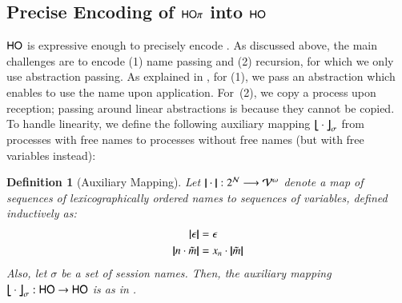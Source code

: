 \documentclass[preprint,11pt]{elsarticle}
\newtheorem{definition}{Definition}[section]
\begin{document}
{\subsection{Precise Encoding of $\mathsf{HO}\pi$ into $\mathsf{HO}$}
\label{subsec:HOpi_to_HO}
$\mathsf{HO}$ is expressive enough to
precisely encode \HOp.
As discussed above, the main challenges are to encode (1) name passing 
and (2) recursion, 
for which 
we only use  abstraction passing. 
 As explained in , for (1), we pass  
an %
abstraction which enables to use the name upon application. 
For~(2), we 
copy a process upon reception; passing around linear abstractions
is  
because 
they cannot be copied.
To handle linearity, we define the following auxiliary 
 mapping 
$\big\lfloor\!\!\big\lfloor\cdot\big\rfloor\!\!\big\rfloor^{}_\sigma$
from processes with free names to processes without free
names (but with free variables instead):


%

%




\begin{definition}[Auxiliary Mapping] \label{d:trabs}\label{d:auxmap}
	Let $|\!|\cdot|\!|: 2^{\mathcal{N}} \longrightarrow \mathcal{V}^\omega$
	denote a map of sequences of lexicographically ordered names to sequences of variables, defined
	inductively 
	as: 
	\begin{align*}
	|\!|\epsilon|\!| & = \epsilon 
	\\
	|\!|n \cdot \tilde{m}|\!| & = x_n \cdot |\!|\tilde{m}|\!|
	\end{align*}
	Also, let $\sigma$ be a set of session names.
	Then, the auxiliary mapping
	$\big\lfloor\!\!\big\lfloor\cdot\big\rfloor\!\!\big\rfloor^{}_\sigma: \mathsf{HO} \to \mathsf{HO}$
	is as in .
\end{definition}

%

}
\end{document}
